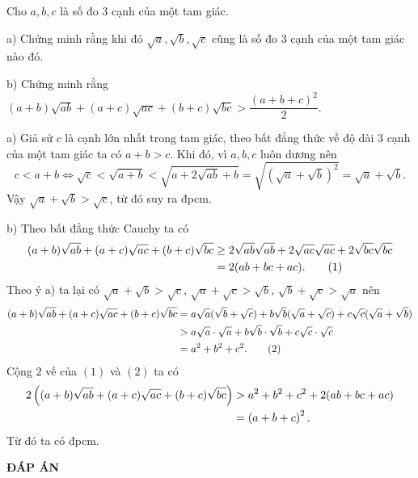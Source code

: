 \begin{ex}%
Cho $a,b,c$ là số đo $3$ cạnh của một tam giác.

\item a) Chứng minh rằng khi đó $\sqrt{a},\sqrt{b},\sqrt{c}$ cũng là số đo 3 cạnh của một tam giác nào đó.
\item b) Chứng minh rằng $(a+b)\sqrt{ab}+(a+c)\sqrt{ac}+(b+c)\sqrt{bc}> \dfrac{(a+b+c)^2}{2}.$ 

\loigiai
{\item a) Giả sử $c$ là cạnh lớn nhất trong tam giác, theo bất đẳng thức về độ dài $3$ cạnh của một tam giác ta có $a+b>c$. Khi đó, vì $a,b,c$ luôn dương nên
	$$c<a+b \Leftrightarrow \sqrt{c} < \sqrt{a+b} < \sqrt{a+2\sqrt{ab}+b} = \sqrt{\left( \sqrt{a}+\sqrt{b}\right) ^2} = \sqrt{a}+\sqrt{b}.$$ 
	Vậy $\sqrt{a}+\sqrt{b}>\sqrt{c}$, từ đó suy ra đpcm.
	\item b) Theo bất đẳng thức Cauchy ta có
	\begin{align}
		(a+b)\sqrt{ab}+(a+c)\sqrt{ac}+(b+c)\sqrt{bc} &\ge 2\sqrt{ab}\sqrt{ab}+2\sqrt{ac}\sqrt{ac}+2\sqrt{bc}\sqrt{bc} \notag \\ &= 2(ab+bc+ac).\tag{1}
	\end{align}
Theo ý a) ta lại có $\sqrt{a}+\sqrt{b}>\sqrt{c}$, $\sqrt{a}+\sqrt{c}>\sqrt{b}$, $\sqrt{b}+\sqrt{c}>\sqrt{a}$ nên
	\begin{align}
	(a+b)\sqrt{ab}+(a+c)\sqrt{ac}+(b+c)\sqrt{bc}&=a\sqrt{a}(\sqrt{b}+\sqrt{c})+b\sqrt{b}(\sqrt{a}+\sqrt{c})+c\sqrt{c}(\sqrt{a}+\sqrt{b}) \notag \\
	&> a\sqrt{a} \cdot \sqrt{a}+b\sqrt{b} \cdot \sqrt{b}+c\sqrt{c} \cdot \sqrt{c} \notag \\
	&=a^2+b^2+c^2. \tag{2}
	\end{align}
Cộng $2$ vế của $(1)$ và $(2)$ ta có
	\begin{align}
2\left( (a+b)\sqrt{ab}+(a+c)\sqrt{ac}+(b+c)\sqrt{bc} \right) &>a^2+b^2+c^2+2(ab+bc+ac) \notag \\
&= \left( a+b+c\right) ^2. \notag
\end{align}
	Từ đó ta có đpcm.
}
\end{ex}
\newpage
\begin{center}
	\textbf{ĐÁP ÁN}
\end{center}
\begin{multicols}{10}
	 
\end{multicols}